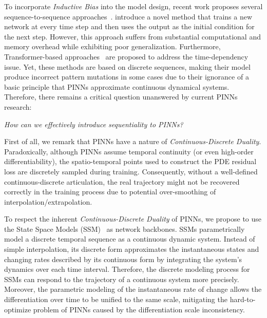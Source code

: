 To incorporate \textit{Inductive Bias} into the model design, recent work proposes several sequence-to-sequence approaches~\cite{krishnapriyan2021characterizing,zhao2024pinnsformer,yang2022learning,gao2022earthformer}. \citet{krishnapriyan2021characterizing} introduce a novel method that trains a new network at every time step and then uses the output as the initial condition for the next step. However, this approach suffers from substantial computational and memory overhead while exhibiting poor generalization. Furthermore, Transformer-based approaches~\cite{zhao2024pinnsformer,yang2022learning,gao2022earthformer} are proposed to address the time-dependency issue. Yet, these methods are based on discrete sequences, making their model produce incorrect pattern mutations in some cases due to their ignorance of a basic principle that PINNs approximate continuous dynamical systems. Therefore, there remains a critical question unanswered by current PINNs research:
\vspace{-2mm}
\begin{center}
\textit{How can we effectively introduce sequentiality to PINNs?}
\end{center}
\vspace{-2mm}


First of all, we remark that PINNs have a nature of \textit{Continuous-Discrete Duality}. Paradoxically, although PINNs assume temporal continuity (or even high-order differentiability), the spatio-temporal points used to construct the PDE residual loss are discretely sampled during training. Consequently, without a well-defined continuous-discrete articulation, the real trajectory might not be recovered correctly in the training process due to potential over-smoothing of interpolation/extrapolation.

To respect the inherent \textit{Continuous-Discrete Duality} of PINNs, we propose to use the State Space Models (SSM)~\cite{gu2023mamba,gu2022efficiently} as network backbones. SSMs parametrically model a discrete temporal sequence as a continuous dynamic system. Instead of simple interpolation, its discrete form approximates the instantaneous states and changing rates described by its continuous form by integrating the system's dynamics over each time interval. Therefore, the discrete modeling process for SSMs can respond to the trajectory of a continuous system more precisely. Moreover, the parametric modeling of the instantaneous rate of change allows the differentiation over time to be unified to the same scale, mitigating the hard-to-optimize problem of PINNs caused by the differentiation scale inconsistency.

